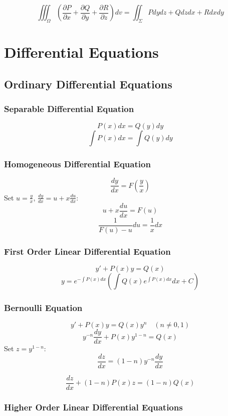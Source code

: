 \documentclass{article}
\begin{document}
\[
    \iiint_\Omega \left(\frac{\partial P}{\partial x} + \frac{\partial Q}{\partial y} + \frac{\partial R}{\partial z}\right) dv = \iint_\Sigma P dy dz + Q dz dx + R dx dy
\]


\newpage
\section{Differential Equations}

\subsection{Ordinary Differential Equations}

\subsubsection{Separable Differential Equation}

\[
    P(x) dx = Q(y) dy
\]
\[
    \int P(x) dx = \int Q(y) dy
\]

\subsubsection{Homogeneous Differential Equation}

\[
    \frac{dy}{dx} = F\left(\frac{y}{x}\right)
\]
Set $u = \frac{y}{x}$, $\frac{dy}{dx} = u + x\frac{du}{dx}$:
\[
    u + x\frac{du}{dx} = F(u)
\]
\[
    \frac{1}{F(u) - u} du = \frac{1}{x} dx
\]

\subsubsection{First Order Linear Differential Equation}

\[
    y' + P(x)y = Q(x)
\]
\[
    y = e^{-\int P(x) dx} \left(\int Q(x) e^{\int P(x) dx} dx + C\right)
\]

\subsubsection{Bernoulli Equation}

\[
    y' + P(x)y = Q(x)y^n \quad (n \neq 0, 1)
\]
\[
    y^{-n} \frac{dy}{dx} + P(x) y^{1-n} = Q(x)
\]
Set $z = y^{1-n}$:
\[
    \frac{dz}{dx} = (1-n) y^{-n} \frac{dy}{dx}
\]

\[
    \frac{dz}{dx} + (1-n)P(x)z = (1-n)Q(x)
\]

\subsubsection{Higher Order Linear Differential Equations}
\end{document}
